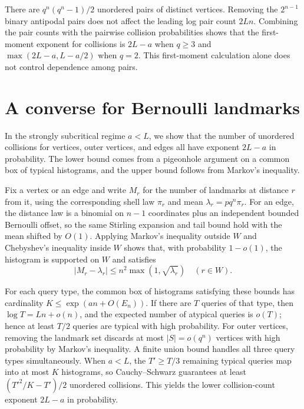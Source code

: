 There are $q^n(q^n-1)/2$ unordered pairs of distinct vertices. Removing the $2^{n-1}$ binary antipodal pairs does not affect the leading log pair count $2Ln$. Combining the pair counts with the pairwise collision probabilities shows that the first-moment exponent for collisions is $2L-a$ when $q\ge3$ and $\max(2L-a,L-a/2)$ when $q=2$. This first-moment calculation alone does not control dependence among pairs.

\section{A converse for Bernoulli landmarks}
In the strongly subcritical regime $a<L$, we show that the number of unordered collisions for vertices, outer vertices, and edges all have exponent $2L-a$ in probability. The lower bound comes from a pigeonhole argument on a common box of typical histograms, and the upper bound follows from Markov's inequality.

Fix a vertex or an edge and write $M_r$ for the number of landmarks at distance $r$ from it, using the corresponding shell law $\pi_r$ and mean $\lambda_r=pq^n\pi_r$. For an edge, the distance law is a binomial on $n-1$ coordinates plus an independent bounded Bernoulli offset, so the same Stirling expansion and tail bound hold with the mean shifted by $O(1)$. Applying Markov's inequality outside $W$ and Chebyshev's inequality inside $W$ shows that, with probability $1-o(1)$, the histogram is supported on $W$ and satisfies
\[
 |M_r-\lambda_r|\le n^2\max(1,\sqrt{\lambda_r})\quad(r\in W).
\]

For each query type, the common box of histograms satisfying these bounds has cardinality $K\le\exp(an+O(E_n))$. If there are $T$ queries of that type, then $\log T=Ln+o(n)$, and the expected number of atypical queries is $o(T)$; hence at least $T/2$ queries are typical with high probability. For outer vertices, removing the landmark set discards at most $|S|=o(q^n)$ vertices with high probability by Markov's inequality. A finite union bound handles all three query types simultaneously. When $a<L$, the $T'\ge T/3$ remaining typical queries map into at most $K$ histograms, so Cauchy--Schwarz guarantees at least $(T'^2/K-T')/2$ unordered collisions. This yields the lower collision-count exponent $2L-a$ in probability.

